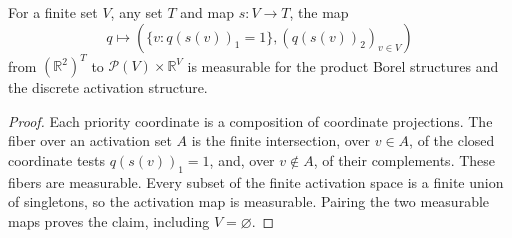\begin{lemma}
For a finite set $V$, any set $T$ and map $s:V\to T$, the map
\[
q\longmapsto (\{v:q(s(v))_1=1\},(q(s(v))_2)_{v\in V})
\]
from $(\mathbb R^2)^T$ to $\mathcal P(V)\times\mathbb R^V$ is measurable
for the product Borel structures and the discrete activation structure.
\end{lemma}
\begin{proof}
Each priority coordinate is a composition of coordinate projections.
The fiber over an activation set $A$ is the finite intersection, over $v\in A$,
of the closed coordinate tests $q(s(v))_1=1$, and, over $v\notin A$, of their
complements. These fibers are measurable. Every subset of the finite activation
space is a finite union of singletons, so the activation map is measurable.
Pairing the two measurable maps proves the claim, including $V=\varnothing$.
\end{proof}
